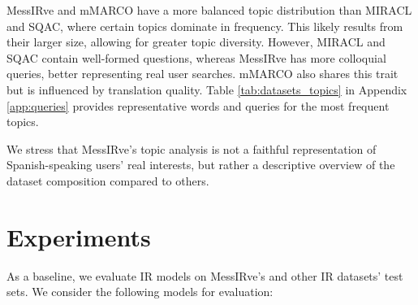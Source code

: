 \documentclass[11pt]{article}
\begin{document}
MessIRve and mMARCO have a more balanced topic distribution than MIRACL and SQAC, where certain topics dominate in frequency. This likely results from their larger size, allowing for greater topic diversity. However, MIRACL and SQAC contain well-formed questions, whereas MessIRve has more colloquial queries, better representing real user searches. mMARCO also shares this trait but is influenced by translation quality. Table \ref{tab:datasets_topics} in Appendix \ref{app:queries} provides representative words and queries for the most frequent topics.

We stress that MessIRve's topic analysis is not a faithful representation of Spanish-speaking users' real interests, but rather a descriptive overview of the dataset composition compared to others.



\section{Experiments} \label{sec:experiments}

As a baseline, we evaluate IR models on MessIRve's and other IR datasets' test sets. 
We consider the following models for evaluation:
\end{document}
